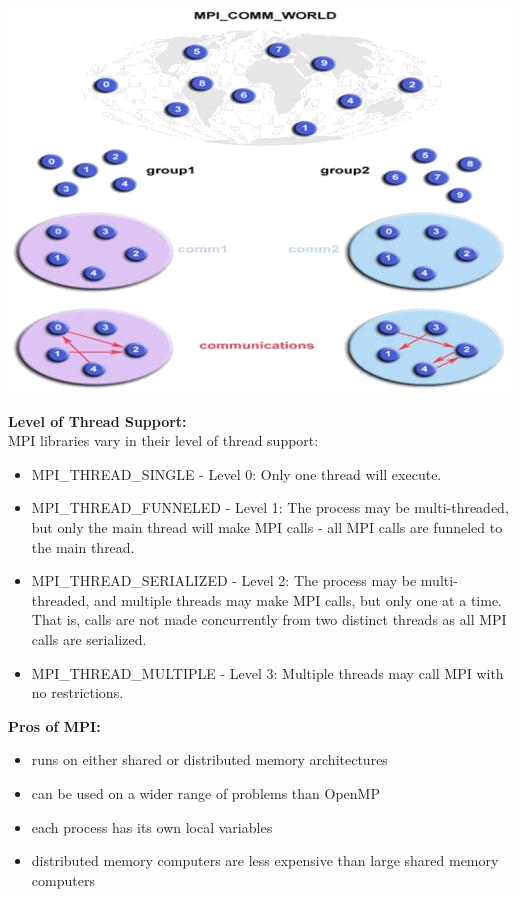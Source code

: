 \documentclass[a4paper,12pt]{article}
\begin{document}
\includegraphics{MPI_04.png}
\newpage

\textbf{Level of Thread Support:} \\ 
MPI libraries vary in their level of thread support: \\
\begin{itemize}
	\item	MPI\_THREAD\_SINGLE - Level 0: Only one thread will execute.  
	\item	MPI\_THREAD\_FUNNELED - Level 1: The process may be multi-threaded, but only the main thread will make MPI calls - all MPI calls are funneled to the main  thread.  
	\item	MPI\_THREAD\_SERIALIZED - Level 2: The process may be multi-threaded, and multiple threads may make MPI calls, but only one at a time. That is, calls are 
	not made concurrently from two distinct threads as all MPI calls are serialized.  
	\item	MPI\_THREAD\_MULTIPLE - Level 3: Multiple threads may call MPI with no restrictions.
\end{itemize}	 
  
\textbf{Pros of MPI:} 
\begin{itemize}
	\item  runs on either shared or distributed memory architectures 
	\item  can be used on a wider range of problems than OpenMP 
	\item  each process has its own local variables 
	\item distributed memory computers are less expensive than large shared memory computers 
\end{itemize} 
 
\end{document}

